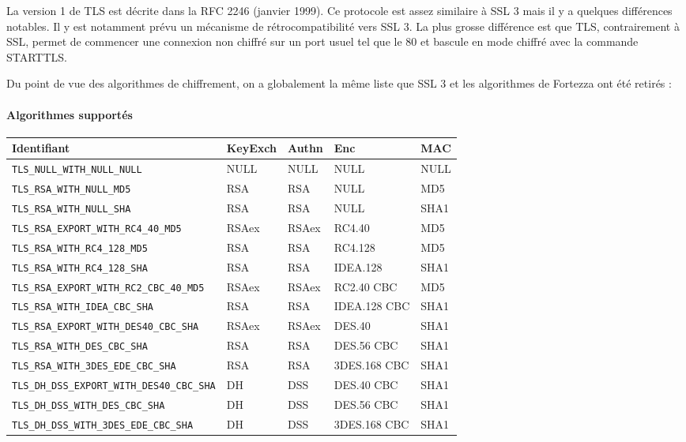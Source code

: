 \documentclass[a4paper,11pt,french]{article}
\begin{document}
La version 1 de TLS est décrite dans la RFC 2246 (janvier 1999). Ce protocole est assez similaire à SSL 3 mais il y a quelques différences notables. Il y est notamment prévu un mécanisme de rétrocompatibilité vers SSL 3. La plus grosse différence est que TLS, contrairement à SSL, permet de commencer une connexion non chiffré sur un port usuel tel que le 80 et bascule en mode chiffré avec la commande STARTTLS.

Du point de vue des algorithmes de chiffrement, on a globalement la même liste que SSL 3 et les algorithmes de Fortezza ont été retirés :

\paragraph{Algorithmes supportés} 
\begin{center}
\begin{tabularx}{17cm}{|l|l|l|X|l|}
\hline
\textbf{Identifiant} & \textbf{KeyExch} & \textbf{Authn}& \textbf{Enc}& \textbf{MAC}\\
\hline
\verb+TLS_NULL_WITH_NULL_NULL+&NULL&NULL&NULL&NULL\\
\hline
\verb+TLS_RSA_WITH_NULL_MD5+&RSA&RSA&NULL&MD5\\
\hline 
\verb+TLS_RSA_WITH_NULL_SHA+&RSA&RSA&NULL&SHA1\\
\hline 
\verb+TLS_RSA_EXPORT_WITH_RC4_40_MD5+&RSAex&RSAex&RC4.40&MD5\\
\hline
\verb+TLS_RSA_WITH_RC4_128_MD5+&RSA&RSA&RC4.128&MD5\\
\hline
\verb+TLS_RSA_WITH_RC4_128_SHA+ &RSA&RSA&IDEA.128&SHA1\\
\hline
\verb+TLS_RSA_EXPORT_WITH_RC2_CBC_40_MD5+&RSAex&RSAex&RC2.40 CBC&MD5 \\
\hline
\verb+TLS_RSA_WITH_IDEA_CBC_SHA+& RSA&RSA&IDEA.128 CBC&SHA1\\
\hline
\verb+TLS_RSA_EXPORT_WITH_DES40_CBC_SHA+&RSAex&RSAex&DES.40&SHA1\\
\hline
\verb+TLS_RSA_WITH_DES_CBC_SHA+& RSA&RSA&DES.56 CBC&SHA1\\
\hline
\verb+TLS_RSA_WITH_3DES_EDE_CBC_SHA+& RSA&RSA&3DES.168 CBC&SHA1\\
\hline
\verb+TLS_DH_DSS_EXPORT_WITH_DES40_CBC_SHA+&DH&DSS&DES.40 CBC&SHA1\\
\hline
\verb+TLS_DH_DSS_WITH_DES_CBC_SHA+ & DH&DSS&DES.56 CBC&SHA1\\
\hline 
\verb+TLS_DH_DSS_WITH_3DES_EDE_CBC_SHA+ & DH&DSS&3DES.168 CBC&SHA1\\

\end{tabularx}
\end{center}
\end{document}
